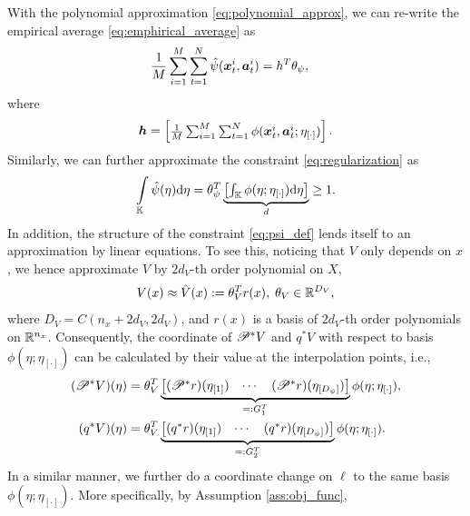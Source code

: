 With the polynomial approximation \eqref{eq:polynomial_approx}, we can re-write the empirical average \eqref{eq:emphirical_average} as
\begin{align*}
    &\frac{1}{M}\sum_{i=1}^M\sum_{t=1}^N\hat\psi(\bm{x}_t^i,\bm{a}_t^i) = h^T\theta_\psi,
\end{align*}
where 
\begin{align*}
\bm h = \begin{bmatrix}
        \frac{1}{M}\sum_{i=1}^M\sum_{t=1}^N\phi(\bm{x}_t^i,\bm{a}_t^i;\eta_{[\cdot]})
    \end{bmatrix}.
\end{align*}
Similarly, we can further approximate the constraint \eqref{eq:regularization} as
\begin{align*}
    \int_\mK \hat\psi(\eta) \mathrm{d}\eta = \theta_\psi^T\underbrace{\begin{bmatrix}
        \int_\mK\phi(\eta;\eta_{[\cdot]})\mathrm{d}\eta
    \end{bmatrix}}_{d} \ge 1.
\end{align*}
In addition, the structure of the constraint \eqref{eq:psi_def} lends itself to an approximation by linear equations.
To see this, noticing that $V$ only depends on $x$, we hence approximate $V$ by $2d_V$-th order polynomial on $X$,
\begin{align*}
    V(x) \approx \hat{V}(x):=\theta_V^T r(x), \; \theta_V \in \mathbb{R}^{D_V},
\end{align*}
where $D_V = C(n_x+2d_V, 2d_V)$, and $r(x)$ is a basis of $2d_V$-th order polynomials on $\mathbb{R}^{n_x}$.
Consequently, the coordinate of $\mathscr{P}^*V$ and $q^*V$ with respect to basis $\phi(\eta;\eta_{[\cdot]})$ can be calculated by their value at the interpolation points, i.e.,
\begin{align*}
    (\mathscr{P}^*V)(\eta) &= \theta_V^T\underbrace{\begin{bmatrix}
        (\mathscr{P}^*r)(\eta_{[1]}) 
        &\cdots 
        &(\mathscr{P}^*r)(\eta_{[D_\psi]})
    \end{bmatrix}}_{=: G_1^T}\phi(\eta;\eta_{[\cdot]}),\\
    (q^*V)(\eta) &= \theta_V^T\underbrace{\begin{bmatrix}
        (q^*r)(\eta_{[1]}) 
        &\cdots 
        &(q^*r)(\eta_{[D_\psi]})
    \end{bmatrix}}_{=: G_2^T}\phi(\eta;\eta_{[\cdot]}).
\end{align*}
In a similar manner, we further do a coordinate change on $\ell$ to the same basis $\phi(\eta;\eta_{[\cdot]})$.
More specifically, by Assumption \ref{ass:obj_func}, 
